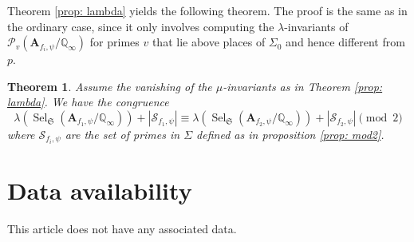 \documentclass{amsart}
\newtheorem{theorem}{Theorem}[section]
\newcommand{\Q}{\mathbb{Q}}
\newcommand{\fS}{\mathfrak{S}}
\newcommand{\bA}{\mathbf{A}}
\newcommand{\Sel}{\operatorname{Sel}}
\newtheorem{auxiliary proposition}[theorem]{Auxiliary Proposition}
\newtheorem{main conjecture}[theorem]{Main Conjecture}
\newtheorem{main theorem}[theorem]{Main Theorem}
\newtheorem{modesty proposition}[theorem]{Modesty Proposition}
\newtheorem{open problem}[theorem]{Open Problem}
\newtheorem{convergence lemma}[theorem]{Convergence Lemma}
\newtheorem{corrected lemma}[theorem]{Corrected Lemma}
\newtheorem{growth lemma}[theorem]{Growth Lemma}
\newtheorem{coefficient lemma}[theorem]{Integrality Lemma}
\newtheorem{interpolation lemma}[theorem]{Interpolation Lemma}
\newtheorem{kernel lemma}[theorem]{Kernel Lemma}
\newtheorem{limit lemma}[theorem]{Limit Lemma}
\newtheorem{tandem lemma}[theorem]{Modesty Lemma}
\newtheorem{zero-finding lemma}[theorem]{Zero-Finding Lemma}
\begin{document}
Theorem  \ref{prop: lambda} yields the following theorem. The proof is the same as in the ordinary case, since it only involves computing the $\lambda$-invariants of $\mathcal{P}_v(\bA_{f_i,\psi}/\Q_\infty)$ for primes $v$ that lie above places of $\Sigma_0$ and hence different from $p$. 
  \begin{theorem}\label{Mainthm2} Assume the vanishing of the $\mu$-invariants as in Theorem \ref{prop: lambda}. 
    We have the congruence
    $$\lambda(\Sel_{\fS}(\bA_{f_1, \psi}/\Q_\infty)) +|\mathcal{S}_{f_1,\psi}|\equiv \lambda(\Sel_{\fS}(\bA_{f_2, \psi}/\Q_\infty))+|\mathcal{S}_{f_2,\psi}| \pmod{2}$$
    where $\mathcal{S}_{f_i,\psi}$ are the set of primes in $\Sigma$ defined as in proposition \ref{prop: mod2}.
\end{theorem}

\section{Data availability}
This article does not have any associated data. 


\end{document}

